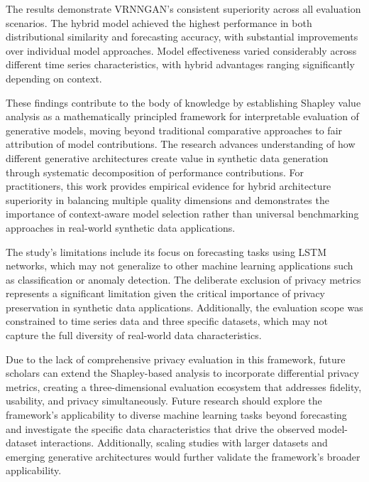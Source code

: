 \documentclass{article}
\begin{document}
The results demonstrate VRNNGAN's consistent superiority across all evaluation scenarios. The hybrid model achieved the highest performance in both distributional similarity and forecasting accuracy, with substantial improvements over individual model approaches. Model effectiveness varied considerably across different time series characteristics, with hybrid advantages ranging significantly depending on context. 

These findings contribute to the body of knowledge by establishing Shapley value analysis as a mathematically principled framework for interpretable evaluation of generative models, moving beyond traditional comparative approaches to fair attribution of model contributions. The research advances understanding of how different generative architectures create value in synthetic data generation through systematic decomposition of performance contributions. For practitioners, this work provides empirical evidence for hybrid architecture superiority in balancing multiple quality dimensions and demonstrates the importance of context-aware model selection rather than universal benchmarking approaches in real-world synthetic data applications.

The study's limitations include its focus on forecasting tasks using LSTM networks, which may not generalize to other machine learning applications such as classification or anomaly detection. The deliberate exclusion of privacy metrics represents a significant limitation given the critical importance of privacy preservation in synthetic data applications. Additionally, the evaluation scope was constrained to time series data and three specific datasets, which may not capture the full diversity of real-world data characteristics.

Due to the lack of comprehensive privacy evaluation in this framework, future scholars can extend the Shapley-based analysis to incorporate differential privacy metrics, creating a three-dimensional evaluation ecosystem that addresses fidelity, usability, and privacy simultaneously. Future research should explore the framework's applicability to diverse machine learning tasks beyond forecasting and investigate the specific data characteristics that drive the observed model-dataset interactions. Additionally, scaling studies with larger datasets and emerging generative architectures would further validate the framework's broader applicability.



\newpage
\end{document}
